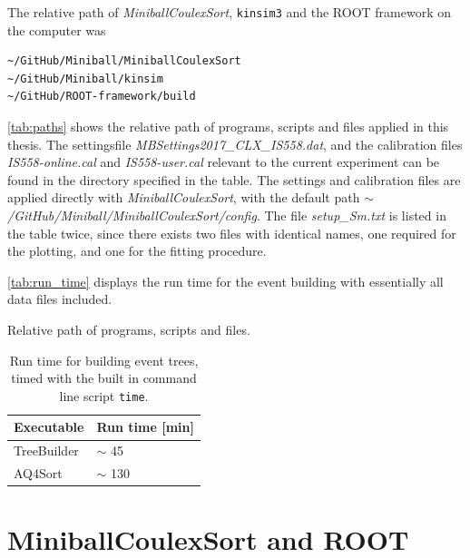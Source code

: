 \documentclass[twoside,english]{uiofysmaster/uiofysmaster}
\let\orgautoref\autoref
\renewcommand{\autoref}
        {%
		 \def\sectionautorefname{Section}%
		 \def\subsectionautorefname{Section}%
		 \def\subsubsectionautorefname{Section}%
		 \def\chapterautorefname{Chapter}%
          \orgautoref}
\begin{document}
\begin{appendices}
The relative path of \textsl{MiniballCoulexSort}, \texttt{kinsim3} and the ROOT framework on the computer was
\begin{lstlisting}[language=sh]
~/GitHub/Miniball/MiniballCoulexSort
~/GitHub/Miniball/kinsim
~/GitHub/ROOT-framework/build
\end{lstlisting}

\autoref{tab:paths} shows the relative path of programs, scripts and files applied in this thesis. 
The settingsfile \textit{MBSettings2017\_CLX\_IS558.dat}, and the calibration files \textit{IS558-online.cal} and \textit{IS558-user.cal} relevant to the current experiment can be found in the directory specified in the table. 
The settings and calibration files are applied directly with \textsl{MiniballCoulexSort}, with the default path \textit{$\sim$/GitHub/Miniball/MiniballCoulexSort/config}.
The file \textit{setup\_Sm.txt} is listed in the table twice, since there exists two files with identical names, one required for the plotting, and one for the fitting procedure. 

\autoref{tab:run_time} displays the run time for the event building with essentially all data files included.

\begin{table}[htb!]
    \centering
    \caption{Relative path of programs, scripts and files.}
	
	\label{tab:paths}
\end{table}

\begin{table}[htb!] 
	\centering 
	\caption{Run time for building event trees, timed with the built in command line script \texttt{time}.}
	\label{tab:run_time}
	\begin{tabular}{ll}
		\hline
		Executable   &  Run time [min] \\
		\hline
		TreeBuilder  &  $\sim$ 45   \\
		AQ4Sort       &  $\sim$ 130  \\
		\hline
	\end{tabular}
\end{table}




\chapter{MiniballCoulexSort and ROOT}\label{ch:MBCS_ROOT}


\end{appendices}
\end{document}
